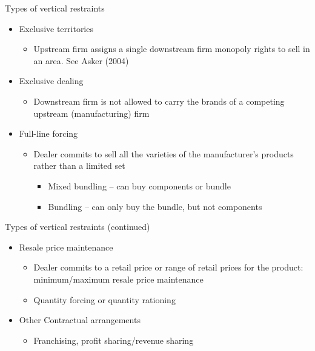 
\begin{frame}
Types of vertical restraints

\begin{itemize}
\item Exclusive territories

\begin{itemize}
\item Upstream firm assigns a single downstream firm monopoly rights to sell
in an area. See Asker (2004)
\end{itemize}

\item Exclusive dealing

\begin{itemize}
\item Downstream firm is not allowed to carry the brands of a competing
upstream (manufacturing) firm
\end{itemize}

\item Full-line forcing

\begin{itemize}
\item Dealer commits to sell all the varieties of the manufacturer's
products rather than a limited set

\begin{itemize}
\item Mixed bundling -- can buy components or bundle

\item Bundling -- can only buy the bundle, but not components
\end{itemize}
\end{itemize}
\end{itemize}
\end{frame}


\begin{frame}
Types of vertical restraints (continued)

\begin{itemize}
\item Resale price maintenance

\begin{itemize}
\item Dealer commits to a retail price or range of retail prices for the
product: minimum/maximum resale price maintenance

\item Quantity forcing or quantity rationing
\end{itemize}

\item Other Contractual arrangements

\begin{itemize}
\item Franchising, profit sharing/revenue sharing
\end{itemize}
\end{itemize}
\end{frame}

